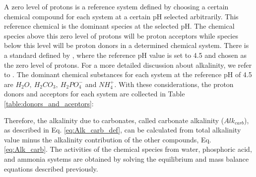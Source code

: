 \begin{refsection}[referencesCh3]
A zero level of protons is a reference system defined by choosing a certain chemical compound for each system at a certain pH selected arbitrarily. This reference chemical is the dominant species at the selected pH. The chemical species above this zero level of protons will be proton acceptors while species below this level will be proton donors in a determined chemical system. There is a standard defined by \citet{Dickson}, where the reference pH value is set to 4.5 and chosen as  the zero level of protons. For a more detailed discussion about alkalinity, we refer to \citet{WolfGladrow}.
The dominant chemical substances for each system at the reference pH of 4.5  are $H_{2}O, \ H_{2}CO_{3}, \ H_{2}PO_{4}^{-}$ and $NH_{4}^{+}$. With these considerations, the proton donors and acceptors for each system are collected in Table \ref{table:donors_and_aceptors}:
\begin{table}[h] 
		\centering
		\caption{Proton donors and acceptors for each chemical system.} \label{table:donors_and_aceptors}
\end{table}


Therefore, the alkalinity due to carbonates, called carbonate alkalinity ($Alk_{carb}$), as described in Eq. \ref{eq:Alk_carb_def}, can be calculated from total alkalinity value minus the alkalinity contribution of the other compounds, Eq. \ref{eq:Alk_carb}. The activities of the chemical species from water, phosphoric acid, and ammonia systems are obtained by solving the equilibrium and mass balance equations described previously.


\end{refsection}
